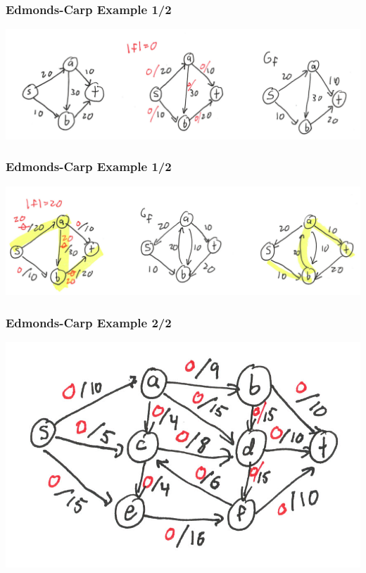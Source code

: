 \documentclass{beamer}
\begin{document}
\begin{frame} \frametitle{Edmonds-Carp Example 1/2}
\begin{center}
  \includegraphics[scale=.6]{ek-1-1.png}
\end{center}
\end{frame}

\begin{frame} \frametitle{Edmonds-Carp Example 1/2}
\begin{center}
  \includegraphics[scale=.6]{ek-1-2.png}
\end{center}
\end{frame}

\begin{frame} \frametitle{Edmonds-Carp Example 2/2}
\begin{center}
  \includegraphics[scale=1]{ek-2-1.png}
\end{center}
\end{frame}
\end{document}
